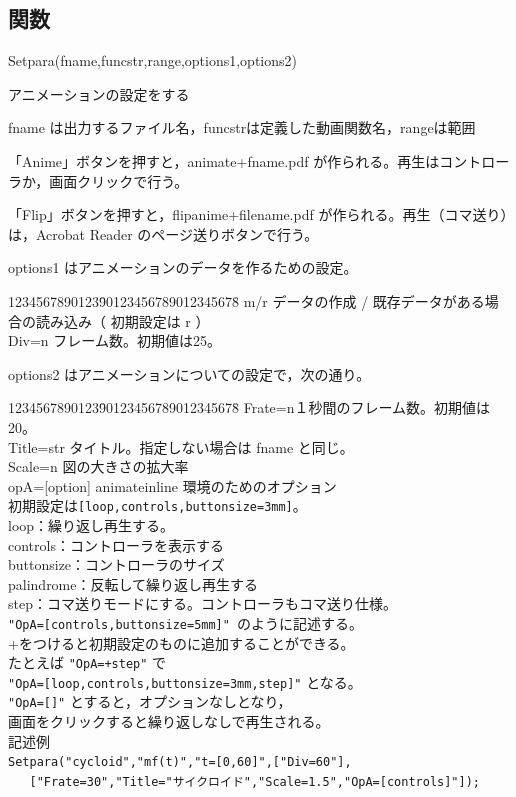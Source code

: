 \documentclass[papersize,a4paper,12pt,uplatex]{jsarticle}
\begin{document}
\subsection{関数}
\begin{description}

\hypertarget{setpara}{}
\item[関数]Setpara(fname,funcstr,range,options1,options2)
\item[機能]アニメーションの設定をする
\item[説明]fname は出力するファイル名，funcstrは定義した動画関数名，rangeは範囲

「Anime」ボタンを押すと，animate+fname.pdf が作られる。再生はコントローラか，画面クリックで行う。

「Flip」ボタンを押すと，flipanime+filename.pdf が作られる。再生（コマ送り）は，Acrobat Reader のページ送りボタンで行う。

options1 はアニメーションのデータを作るための設定。
\begin{tabbing}
1234567890123\=90123456789012345678\=\kill
m/r\> データの作成 / 既存データがある場合の読み込み（ 初期設定は r ）\\
Div=n\> フレーム数。初期値は25。
\end{tabbing}
options2 はアニメーションについての設定で，次の通り。
\begin{tabbing}
1234567890123\=90123456789012345678\=\kill
Frate=n\>１秒間のフレーム数。初期値は20。 \\
Title=str\> タイトル。指定しない場合は fname と同じ。\\
Scale=n\> 図の大きさの拡大率 \\
opA=[option]\>  animateinline 環境のためのオプション \\
\>初期設定は\verb|[loop,controls,buttonsize=3mm]|。\\
\> loop：繰り返し再生する。\\
\> controls：コントローラを表示する\\
\> buttonsize：コントローラのサイズ\\
\> palindrome：反転して繰り返し再生する\\
\> step：コマ送りモードにする。コントローラもコマ送り仕様。\\
\>\verb|"OpA=[controls,buttonsize=5mm]" |のように記述する。\\
\> +をつけると初期設定のものに追加することができる。\\
\>たとえば \verb|"OpA=+step"| で\\
\>\verb|"OpA=[loop,controls,buttonsize=3mm,step]"| となる。\\
\>\verb|"OpA=[]"| とすると，オプションなしとなり，\\
\>画面をクリックすると繰り返しなしで再生される。\\
記述例\\
\verb|Setpara("cycloid","mf(t)","t=[0,60]",["Div=60"],|\\
\verb|   ["Frate=30","Title="サイクロイド","Scale=1.5","OpA=[controls]"]);|\\
\end{tabbing}


\end{description}
\end{document}
